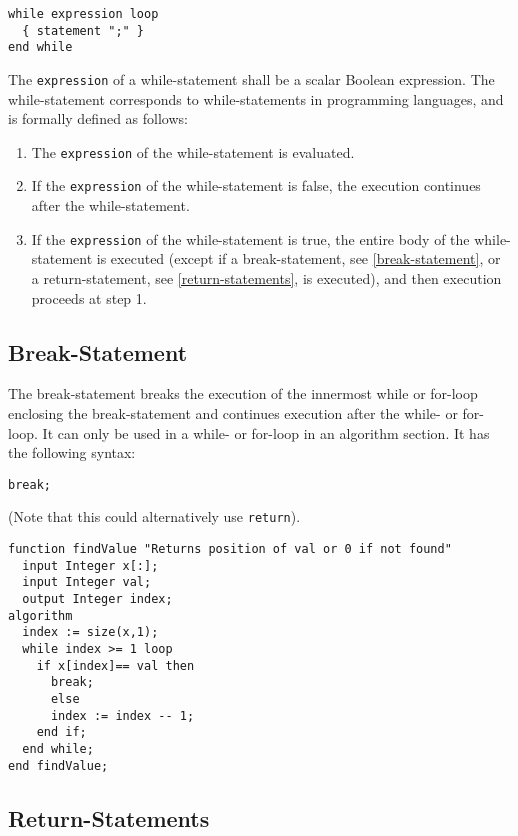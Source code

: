 \begin{lstlisting}[language=grammar]
while expression loop
  { statement ";" }
end while
\end{lstlisting}
The \lstinline!expression! of a while-statement shall be a scalar Boolean
expression. The while-statement corresponds to while-statements in
programming languages, and is formally defined as follows:
\begin{enumerate}
\item The \lstinline!expression! of the while-statement is evaluated.
\item If the \lstinline!expression! of the while-statement is false, the execution
continues after the while-statement.
\item If the \lstinline!expression! of the while-statement is true, the entire body of
the while-statement is executed (except if a break-statement, see
\autoref{break-statement}, or a return-statement, see \autoref{return-statements}, is executed),
and then execution proceeds at step 1.
\end{enumerate}

\subsection{Break-Statement}

The break-statement breaks the execution of the innermost while or
for-loop enclosing the break-statement and continues execution after the
while- or for-loop. It can only be used in a while- or for-loop in an
algorithm section. It has the following syntax:

\begin{lstlisting}[language=modelica]
break;
\end{lstlisting}


\begin{example}
(Note that this could alternatively use \lstinline!return!).
\begin{lstlisting}[language=modelica]
function findValue "Returns position of val or 0 if not found"
  input Integer x[:];
  input Integer val;
  output Integer index;
algorithm
  index := size(x,1);
  while index >= 1 loop
    if x[index]== val then
      break;
      else
      index := index -- 1;
    end if;
  end while;
end findValue;
\end{lstlisting}
\end{example}

\subsection{Return-Statements}


